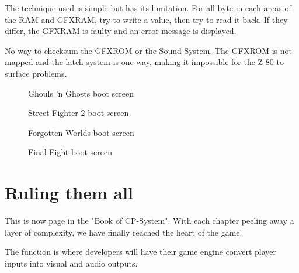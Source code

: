 The technique used is simple but has its limitation. For all byte in each areas of the RAM and GFXRAM, try to write a value, then try to read it back. If they differ, the GFXRAM is faulty and an error message is displayed. 

\begin{trivia}
No way to checksum the GFXROM or the Sound System. The GFXROM is not mapped and the latch system is one way, making it impossible for the Z-80 to surface problems.
\end{trivia}

\vfill
\begin{figure}[H]
\caption*{Ghouls 'n Ghosts boot screen}
\end{figure}


\begin{figure}[H]
\caption*{Street Fighter 2 boot screen}
\end{figure}











\begin{figure}[H]
\caption*{Forgotten Worlds boot screen}
\end{figure}



\vfill
\begin{figure}[H]
\caption*{Final Fight boot screen}
\end{figure}






\section{Ruling them all}
\label{this}
This is now \pageref{this} page in the "Book of CP-System". With each chapter peeling away a layer of complexity, we have finally reached the heart of the game. 

The function  is where developers will have their game engine convert player inputs into visual and audio outputs.

